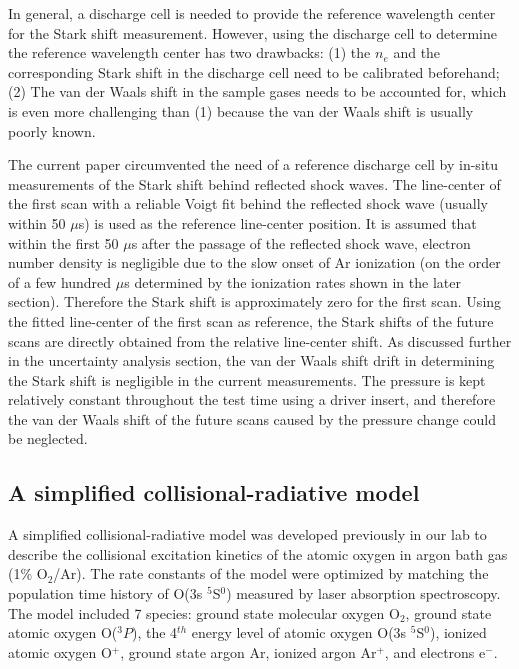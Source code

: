 \documentclass[12pt]{iopart}
\begin{document}
In general, a discharge cell is needed to provide the reference wavelength center for the Stark shift measurement\cite{Baer1992c}. However, using the discharge cell to determine the reference wavelength center has two drawbacks: (1) the $n_e$ and the corresponding Stark shift in the discharge cell need to be calibrated beforehand; (2) The van der Waals shift in the sample gases needs to be accounted for, which is even more challenging than (1) because the van der Waals shift is usually poorly known. 

The current paper circumvented the need of a reference discharge cell by in-situ measurements of the Stark shift behind reflected shock waves. The line-center of the first scan with a reliable Voigt fit behind the reflected shock wave (usually within 50 $\mu$s) is used as the reference line-center position. It is assumed that within the first 50 $\mu$s after the passage of the reflected shock wave, electron number density is negligible due to the slow onset of Ar ionization (on the order of a few hundred $\mu$s determined by the ionization rates shown in the later section). Therefore the Stark shift is approximately zero for the first scan. Using the fitted line-center of the first scan as reference, the Stark shifts of the future scans are directly obtained from the relative line-center shift.  As discussed further in the uncertainty analysis section, the van der Waals shift drift in determining the Stark shift is negligible in the current measurements. The pressure is kept relatively constant throughout the test time using a driver insert, and therefore the van der Waals shift of the future scans caused by the pressure change could be neglected.


\subsection{A simplified collisional-radiative model}
A simplified collisional-radiative model was developed previously in our lab to describe the collisional excitation kinetics of the atomic oxygen in argon bath gas (1\% O$_2$/Ar)\cite{Li2019_modeling}. The rate constants of the model were optimized by matching the population time history of O(3s $^5$S$^0$) measured by laser absorption spectroscopy. The model included 7 species: ground state molecular oxygen O$_2$, ground state atomic oxygen O($^3P$), the 4$^{th}$ energy level of atomic oxygen O(3s $^5$S$^0$), ionized atomic oxygen O$^+$, ground state argon Ar, ionized argon Ar$^+$, and electrons e$^-$. 
\end{document}
